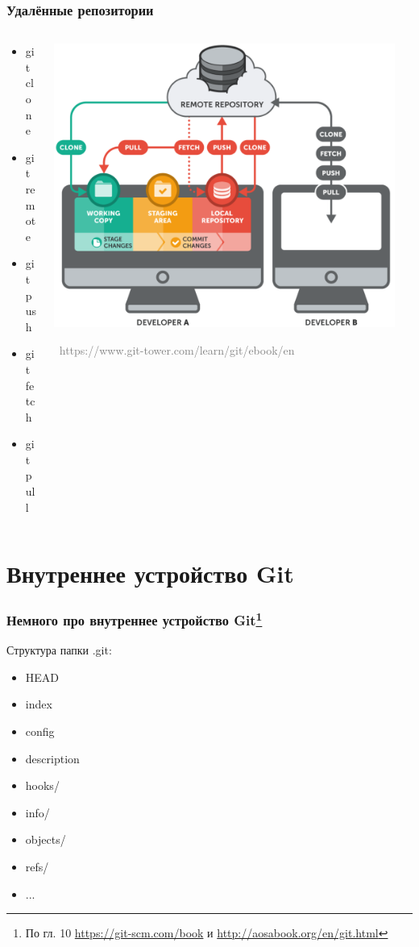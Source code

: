 \documentclass[xetex,mathserif,serif]{beamer}
\newcommand{\attribution}[1] {
\vspace{-5mm}\begin{flushright}\begin{scriptsize}\textcolor{gray}{\textcopyright\, #1}\end{scriptsize}\end{flushright}
}
\begin{document}
	\begin{frame}
		\frametitle{Удалённые репозитории}
		\begin{columns}
			\begin{column}{0.4\textwidth}
				\begin{itemize}
					\item git clone
					\item git remote
					\item git push
					\item git fetch
					\item git pull
				\end{itemize}
			\end{column}
			\begin{column}{0.6\textwidth}
				\begin{center}
					\includegraphics[width=0.95\textwidth]{remoteRepos.png}
					\attribution{https://www.git-tower.com/learn/git/ebook/en}
				\end{center}
			\end{column}
		\end{columns}
	\end{frame}

	\section{Внутреннее устройство Git}

	\begin{frame}
		\frametitle{Немного про внутреннее устройство Git\footnote{\tiny{По гл. 10 \url{https://git-scm.com/book} и \url{http://aosabook.org/en/git.html}}}}
		Структура папки .git:
		\begin{itemize}
			\item HEAD
			\item index
			\item config
			\item description
			\item hooks/
			\item info/
			\item objects/
			\item refs/
			\item ...
		\end{itemize}
	\end{frame}
\end{document}
